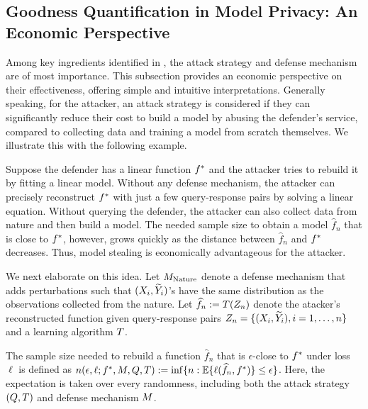     \subsection{Goodness Quantification in Model Privacy: An Economic Perspective}\label{subsec:quantify}
        Among key ingredients identified in , the attack strategy and defense mechanism are of most importance. This subsection provides an economic perspective on their effectiveness, offering simple and intuitive interpretations. 
        Generally speaking, for the attacker,
        an attack strategy is considered \textit{\eco} if they can significantly reduce their cost to build a model by abusing the defender's service, compared to collecting data and training a model from scratch themselves. We illustrate this with the following example. 
        
        \begin{example}\label{ex:lin}
            Suppose the defender has a linear function $f^*$ and the attacker tries to rebuild it by fitting a linear model. Without any defense mechanism, the attacker can precisely reconstruct $f^*$ with just a few query-response pairs by solving a linear equation. 
            Without querying the defender, the attacker can also collect data from nature and then build a model. The needed sample size to obtain a model $\hat{f}_n$ that is close to $f^*$, however, grows quickly as the distance between $\hat{f}_n$ and $f^*$ decreases. 
            Thus, model stealing is economically advantageous for the attacker.
        \end{example}

        We next elaborate on this idea. Let $M_{\textrm{Nature}}$ denote a defense mechanism that adds perturbations such that $(X_i,\widetilde{Y}_i)$'s have the same distribution as the observations collected from the nature. Let $\widehat{f}_n := T(Z_n)$ denote the atacker's reconstructed function given query-response pairs $Z_n=\{(X_i,\widetilde{Y}_i), i=1,\dots,n\}$ and a learning algorithm $T$.


        \begin{definition} \label{def:steal_sample_size}
        The sample size needed to rebuild a function $\hat{f}_n$ that is $\epsilon$-close to $f^*$ under loss $\ell$ is defined as $n(\epsilon,\ell;f^*,M,Q,T) := \inf\{n:  \mathbb{E} \{\ell(\widehat{f}_n, f^*) \}\leq \epsilon\}$. Here, the expectation is taken over every randomness, including both the attack strategy $(Q, T)$ and defense mechanism $M$.
        \end{definition}
        
